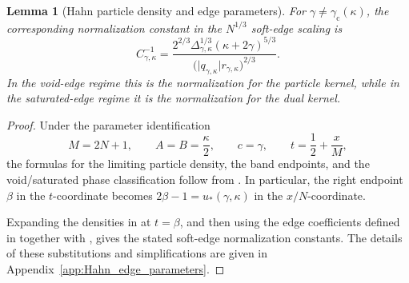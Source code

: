 \documentclass[reqno,11pt]{amsart}
\theoremstyle{plain}
\newtheorem{lemma}[thm]{Lemma}
\theoremstyle{definition}
\numberwithin{equation}{section}
\begin{document}
\begin{lemma}[Hahn particle density and edge parameters]
For \(\gamma\neq\gamma_{\mathrm c}(\kappa)\), the corresponding
normalization constant in the \(N^{1/3}\) soft-edge scaling is
\[
C_{\gamma,\kappa}^{-1}
=
\frac{
2^{2/3}
\Delta_{\gamma,\kappa}^{1/3}
(\kappa+2\gamma)^{5/3}
}{
\bigl(
\lvert q_{\gamma,\kappa}\rvert
r_{\gamma,\kappa}
\bigr)^{2/3}
}.
\]
In the void-edge regime this is the normalization for the particle
kernel, while in the saturated-edge regime it is the normalization
for the dual kernel.
\end{lemma}

\begin{proof}
Under the parameter identification
\[
M=2N+1,
\qquad
A=B=\frac{\kappa}{2},
\qquad
c=\gamma,
\qquad
t=\frac12+\frac{x}{M},
\]
the formulas for the limiting particle density, the band endpoints,
and the void/saturated phase classification follow from
\cite[formulas~(2.73), (2.75)--(2.79) and
Theorem~2.17]{baik2007discrete}. In particular, the right endpoint
$\beta$ in the $t$-coordinate becomes $2\beta-1=u_{\ast}(\gamma,\kappa)$
in the $x/N$-coordinate.

Expanding the densities in \cite[formulas~(2.77) and
(2.79)]{baik2007discrete} at \(t=\beta\), and then using the
edge coefficients defined in \cite[formulas~(3.16) and
(3.18)]{baik2007discrete} together with
\cite[Theorems~3.7 and~3.8]{baik2007discrete}, gives the stated
soft-edge normalization constants. 
The details of these substitutions and simplifications are given in
Appendix~\ref{app:Hahn_edge_parameters}.
\end{proof}
\end{document}
